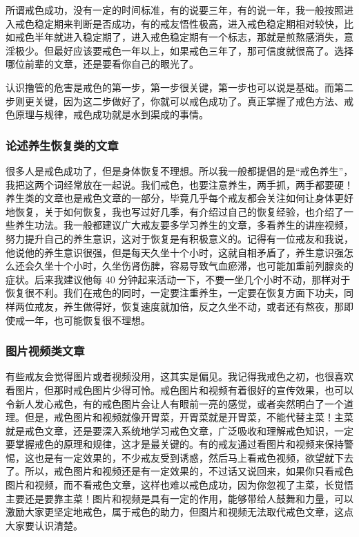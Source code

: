 \documentclass{ctexart}
\begin{document}
所谓戒色成功，没有一定的时间标准，有的说要三年，有的说一年，我一般按照进入戒色稳定期来判断是否成功，有的戒友悟性极高，进入戒色稳定期相对较快，比如戒色半年就进入稳定期了，进入戒色稳定期有一个标志，那就是煎熬感消失，意淫极少。但最好应该要戒色一年以上，如果戒色三年了，那可信度就很高了。选择哪位前辈的文章，还是要看你自己的眼光了。

认识撸管的危害是戒色的第一步，第一步很关键，第一步也可以说是基础。而第二步则更关键，因为这二步做好了，你就可以戒色成功了。真正掌握了戒色方法、戒色原理与规律，戒色成功就是水到渠成的事情。

\subsubsection{论述养生恢复类的文章}

很多人是戒色成功了，但是身体恢复不理想。所以我一般都提倡的是“戒色养生”，我把这两个词经常放在一起说。我们戒色，也要注意养生，两手抓，两手都要硬！养生类的文章也是戒色文章的一部分，毕竟几乎每个戒友都会关注如何让身体更好地恢复，关于如何恢复，我也写过好几季，有介绍过自己的恢复经验，也介绍了一些养生功法。我一般都建议广大戒友要多学习养生的文章，多看养生的讲座视频，努力提升自己的养生意识，这对于恢复是有积极意义的。记得有一位戒友和我说，他说他的养生意识很强，但是每天久坐十个小时，这就自相矛盾了，养生意识强怎么还会久坐十个小时，久坐伤肾伤脾，容易导致气血瘀滞，也可能加重前列腺炎的症状。后来我建议他每 40 分钟起来活动一下，不要一坐几个小时不动，那样对于恢复很不利。我们在戒色的同时，一定要注重养生，一定要在恢复方面下功夫，同样两位戒友，养生做得好，恢复速度就加倍，反之久坐不动，或者还有熬夜，那即使戒一年，也可能恢复很不理想。

\subsubsection{图片视频类文章}

有些戒友会觉得图片或者视频没用，这其实是偏见。我记得我戒色之初，也很喜欢看图片，但那时戒色图片少得可怜。戒色图片和视频有着很好的宣传效果，也可以令新人发心戒色，有的戒色图片会让人有眼前一亮的感觉，或者突然明白了一个道理。但是，戒色图片和视频就像开胃菜，开胃菜就是开胃菜，不能代替主菜！主菜就是戒色文章，还是要深入系统地学习戒色文章，广泛吸收和理解戒色知识，一定要掌握戒色的原理和规律，这才是最关键的。有的戒友通过看图片和视频来保持警惕，这也是有一定效果的，不少戒友受到诱惑，然后马上看戒色视频，欲望就下去了。所以，戒色图片和视频还是有一定效果的，不过话又说回来，如果你只看戒色图片和视频，而不看戒色文章，这样也难以戒色成功，因为你忽视了主菜，长觉悟主要还是要靠主菜！图片和视频是具有一定的作用，能够带给人鼓舞和力量，可以激励大家更坚定地戒色，属于戒色的助力，但图片和视频无法取代戒色文章，这点大家要认识清楚。
\end{document}

